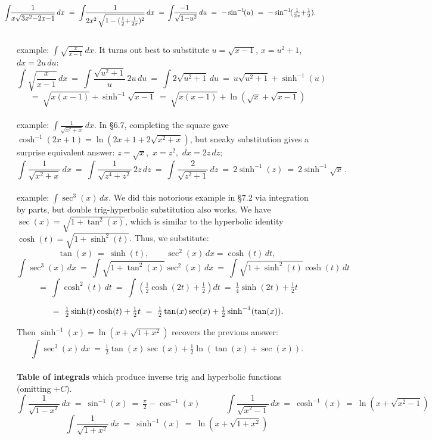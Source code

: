 \documentclass[11pt]{article}
\begin{document}
$$\hspace{-.25in}
\int\!\!\frac{1}{x\sqrt{3x^2{-}2x{-}1}}\,dx 
\ =\ \int\!\! \frac{1}{2x^2\,\sqrt{1-(\frac12 {+} \frac1{2x})^2}}\,dx
\ =\ \!\int\!\! \frac{\!\!-1}{\sqrt{1{-}u^2}}\,du
\ =\  -\sin^{-1\!}(u) \ = \ -\sin^{-1\!}(\tfrac1{2x} {+}\tfrac12).
$$
\\[0em]
{\sc example:} $\int\!\! \sqrt{\frac{x}{x-1}} \,dx$. It turns out best to substitute
$u=\sqrt{x{-}1}$, $x=u^2{+}1$, $dx = 2u\,du$:
$$
\int\!\!\sqrt{\frac{x}{x{-}1}}\,dx \ = \
\int\!\frac{\sqrt{u^2{+}1}}u\,2u\,du \ =\ 
\int 2\sqrt{u^2{+}1}\,du
\ = \ u\sqrt{u^2{+}1} + \sinh^{-1}(u)
$$
$$
\ = \ \sqrt{x(x{-}1)} + \sinh^{-1}\!\sqrt{x{-}1}
\ =\ \sqrt{x(x{-}1)} +\ln(\sqrt x + \sqrt{x{-}1})
$$
\\[-.3em] 
{\sc example:} $\int\!\frac{1}{\sqrt{x^2+x}}\,dx$. 
In \S6.7, completing the square gave $\cosh^{-1\!}(2x{+}1)=\ln(2x{+}1{+}2\sqrt{x^2{+}x})$, 
but sneaky substitution gives a surprise equivalent answer: $z=\sqrt{x}$,\, $x=z^2$,\, $dx=2z\,dz$;
$$
\int\!\!\frac{1}{\sqrt{x^2+x}}\,dx
\ =\ 
\int\!\!\frac{1}{\sqrt{z^4+z^2}}\,2z\,dz
\ =\ 
\int\!\!\frac{2}{\sqrt{z^2+1}}\,dz
\ =\ 
2\sinh^{-1}(z) 
\ = \ 2\sinh^{-1}\!\!\sqrt x\,.
$$
\\[-.3em] 
{\sc example:} $\int \sec^3(x)\,dx$. We did this notorious example
in \S7.2 via integration by parts, 
but double trig-hyperbolic substitution also works. 
We have $\sec(x)=\sqrt{1{+}\tan^2(x)}$, which is similar to the
hyperbolic identity $\cosh(t)=\sqrt{1{+}\sinh^2(t)}$. Thus, we substitute:
$$
\tan(x) \ =\ \sinh(t), \qquad \sec^2(x)\,dx = \cosh(t)\,dt,
$$
$$
\int \sec^3(x)\,dx \ =\ 
\int \sqrt{1{+}\tan^2(x)}\sec^2(x)\,dx
 \ =\ 
\int \sqrt{1{+}\sinh^2(t)}\cosh(t)\,dt
$$
$$
\ = \ \int \cosh^2(t)\,dt 
\ = \ \int \!\left(\tfrac12\cosh(2t){+}\tfrac12\right)dt
\ =\ \tfrac14\sinh(2t)+\tfrac12 t
$$
$$
\ = \ \tfrac12 \sinh(t)\cosh(t) + \tfrac12 t
\ =\ \tfrac12\tan(x)\sec(x) + \tfrac12\sinh^{-1}(\tan(x)).
\vphantom{\int}
$$
Then $\sinh^{-1}(x) = \ln(x + \sqrt{1{+}x^2})$ recovers the previous answer:
$$
\int \sec^3(x)\,dx \ =\ \tfrac12\tan(x)\sec(x)+\tfrac12\ln(\tan(x){+}\sec(x)).
$$
\\[.5em]
{\bf Table of integrals} 
which produce inverse trig and hyperbolic functions (omitting $+C$).
$$
\int\!\! \frac1{\sqrt{1-x^2}}\,dx \ =\ \sin^{-1}(x) \ =\ \tfrac\pi 2 - \cos^{-1}(x)
\qquad\quad
\int\!\! \frac1{\sqrt{x^2-1}}\,dx \ =\ \cosh^{-1}(x) \ =\ \ln(x+\sqrt{x^2-1}) 
$$
$$
\int\!\! \frac1{\sqrt{1+x^2}}\,dx \ =\ \sinh^{-1}(x) \ =\ \ln(x+\sqrt{1+x^2})
$$
\\[-.7em]
\end{document}

